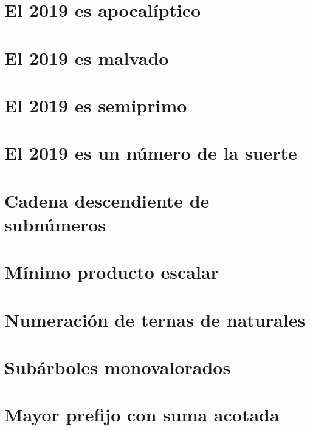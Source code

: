 \documentclass[a4paper,12pt,twoside]{book}
\begin{document}
\chapter{El 2019 es apocalíptico}
\label{190101}

\chapter{El 2019 es malvado}
\label{190102}

\chapter{El 2019 es semiprimo}
\label{190103}

\chapter{El 2019 es un número de la suerte}
\label{190104}


\chapter{Cadena descendiente de subnúmeros}
\label{190107}

\chapter{Mínimo producto escalar}
\label{190108}

\chapter{Numeración de ternas de naturales}
\label{190109}

\chapter{Subárboles monovalorados}
\label{190110}

\chapter{Mayor prefijo con suma acotada}
\label{190111}
\end{document}
